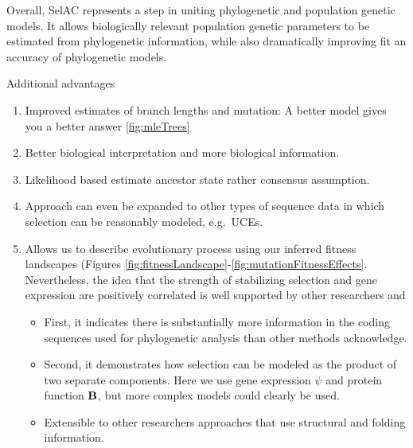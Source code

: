 \documentclass{article}
\newcommand{\Func}{\ensuremath{\text{\textbf{B}}}\xspace}
\newcommand{\selac}{SelAC\xspace}
\begin{document}
Overall, \selac represents a step in uniting phylogenetic and population genetic models.
It allows biologically relevant population genetic parameters to be estimated from phylogenetic information, while also dramatically improving fit an accuracy of phylogenetic models.









Additional advantages
\begin{enumerate}
\item Improved estimates of branch lengths and mutation: A better model gives you a better answer \ref{fig:mleTrees}
\item Better biological interpretation and more biological information.
\item Likelihood based estimate ancestor state rather consensus assumption.
\item Approach can even be expanded to other types of sequence data in which selection can be reasonably modeled, e.g.~UCEs.
\item Allows us to describe evolutionary process using our inferred fitness landscapes (Figures \ref{fig:fitnessLandscape}-\ref{fig:mutationFitnessEffects}.
Nevertheless, the idea that the strength of stabilizing selection and gene expression are positively correlated is well supported by other researchers \citep[e.g.~][]{DrummondEtAl2005} and 
\begin{itemize}
\item First, it indicates there is substantially more information in the coding sequences used for phylogenetic analysis than other methods acknowledge.
\item Second, it demonstrates how selection can be modeled as the product of two separate components.
  Here we use gene expression $\psi$ and protein function \Func, but more complex models could clearly be used.  
\item Extensible to other researchers approaches that use structural and folding  information.

\end{itemize}
\end{enumerate}
\end{document}
